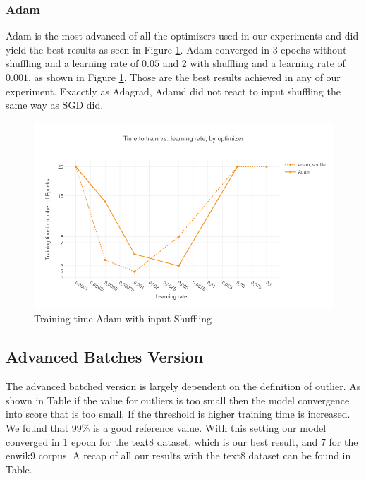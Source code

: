 \subsubsection{Adam}
Adam is the most advanced of all the optimizers used in our experiments and did yield the best results as seen in Figure \ref{fig:results_adam_shuffle}. Adam converged in 3 epochs without shuffling and a learning rate of $0.05$ and 2 with shuffling and a learning rate of $0.001$, as shown in Figure \ref{fig:results_adam_shuffle}. Those are the best results achieved in any of our experiment. Exacctly as Adagrad, Adamd did not react to input shuffling the same way as SGD did.
\begin{figure}[h]
    \centering
            \includegraphics[scale=0.3]{images/results_adam_shuffle} 
    \caption{Training time Adam with input Shuffling}
    \label{fig:results_adam_shuffle}
\end{figure}

\subsection{Advanced Batches Version}
The advanced batched version is largely dependent on the definition of outlier. As shown in Table if the value for outliers is too small then the model convergence into score that is too small. If the threshold is higher training time is increased. We found that 99\% is a good reference value. With this setting our model converged in 1 epoch for the text8 dataset, which is our best result, and 7 for the enwik9 corpus. A recap of all our results with the text8 dataset can be found in Table. 


